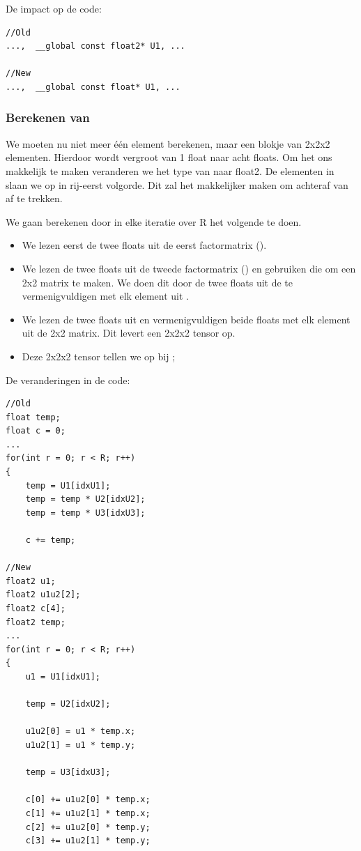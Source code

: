 De impact op de code:
\begin{lstlisting}
//Old
...,  __global const float2* U1, ...

//New
...,  __global const float* U1, ...
\end{lstlisting}


\subsubsection{Berekenen van \CC{}}
We moeten nu niet meer \'e\'en element berekenen, maar een blokje van 2x2x2 elementen. Hierdoor wordt \CC{} vergroot van 1 float naar acht floats. Om het ons makkelijk te maken veranderen we het type van \CC{} naar float2. De elementen in \CC{} slaan we op in rij-eerst volgorde. Dit zal het makkelijker maken om achteraf \TT{} van \CC{} af te trekken.

We gaan \CC{} berekenen door in elke iteratie over R het volgende te doen.
\begin{itemize}
    \item We lezen eerst de twee floats uit de eerst factormatrix ().
    \item We lezen de twee floats uit de tweede factormatrix () en gebruiken die om een 2x2 matrix te maken. We doen dit door de twee floats uit de  te vermenigvuldigen met elk element uit .
    \item We lezen de twee floats uit  en vermenigvuldigen beide floats met elk element uit de 2x2 matrix. Dit levert een 2x2x2 tensor op.
    \item Deze 2x2x2 tensor tellen we op bij \CC{};
\end{itemize}

De veranderingen in de code:
\begin{lstlisting}
//Old
float temp;
float c = 0;
...
for(int r = 0; r < R; r++)
{
	temp = U1[idxU1];
	temp = temp * U2[idxU2];
	temp = temp * U3[idxU3];

	c += temp;

//New
float2 u1;
float2 u1u2[2];
float2 c[4];
float2 temp;
...
for(int r = 0; r < R; r++)
{ 
	u1 = U1[idxU1];

	temp = U2[idxU2];

	u1u2[0] = u1 * temp.x;
	u1u2[1] = u1 * temp.y;

	temp = U3[idxU3];

	c[0] += u1u2[0] * temp.x;
	c[1] += u1u2[1] * temp.x;
	c[2] += u1u2[0] * temp.y;
	c[3] += u1u2[1] * temp.y;
\end{lstlisting}

